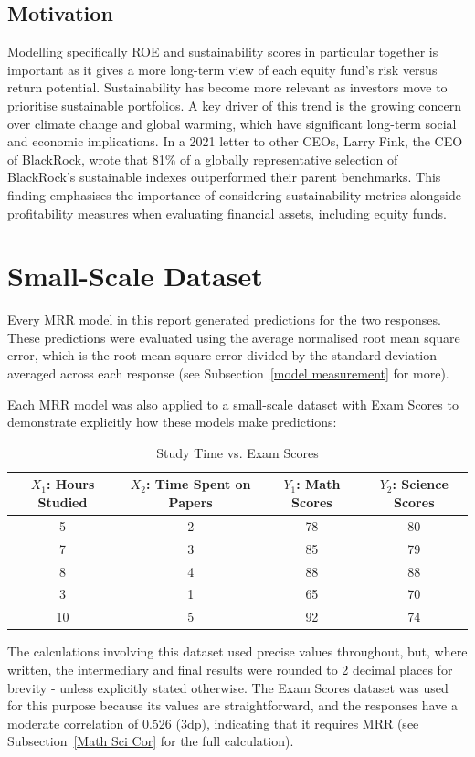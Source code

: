 \documentclass[11pt]{report} %
\begin{document}
\subsection{Motivation}
Modelling specifically ROE and sustainability scores in particular together is important as it gives a more long-term view of each equity fund's risk versus return potential. Sustainability has become more relevant as investors move to prioritise sustainable portfolios. A key driver of this trend is the growing concern over climate change and global warming, which have significant long-term social and economic implications. In a 2021 letter to other CEOs, Larry Fink, the CEO of BlackRock, wrote that 81\% of a globally representative selection of BlackRock's sustainable indexes outperformed their parent benchmarks.\cite{Fink2021Letter} This finding emphasises the importance of considering sustainability metrics alongside profitability measures when evaluating financial assets, including equity funds.

\section{Small-Scale Dataset}
Every MRR model in this report generated predictions for the two responses. These predictions were evaluated using the average normalised root mean square error, which is the root mean square error divided by the standard deviation averaged across each response (see Subsection~\ref{model measurement} for more). 

Each MRR model was also applied to a small-scale dataset with Exam Scores to demonstrate explicitly how these models make predictions:
\setlength{\tabcolsep}{3pt} %
\begin{table}[H]
    \centering
    \begin{tabular}{|c|c|c|c|}
        \hline
        \( X_1 \): Hours Studied & \( X_2 \): Time Spent on Papers & \( Y_1 \): Math Scores & \( Y_2 \): Science Scores\\
        \hline
        5  & 2  & 78 & 80 \\
        7  & 3  & 85 & 79 \\
        8  & 4  & 88 & 88 \\
        3  & 1  & 65 & 70 \\
        10 & 5  & 92 & 74 \\
        \hline
    \end{tabular}
    \caption{Study Time vs. Exam Scores}
    \label{tab:study_scores1}
\end{table}
\noindent The calculations involving this dataset used precise values throughout, but, where written, the intermediary and final results were rounded to 2 decimal places for brevity - unless explicitly stated otherwise. The Exam Scores dataset was used for this purpose because its values are straightforward, and the responses have a moderate correlation of 0.526 (3dp), indicating that it requires MRR (see Subsection~\ref{Math Sci Cor} for the full calculation). 
\end{document}
